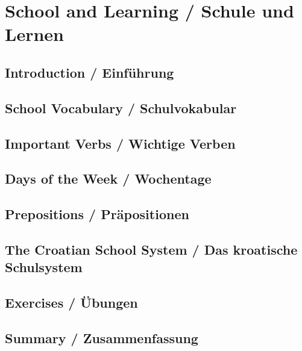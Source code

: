 \chapter{School and Learning / Schule und Lernen}

\section{Introduction / Einführung}

\section{School Vocabulary / Schulvokabular}

\section{Important Verbs / Wichtige Verben}

\section{Days of the Week / Wochentage}

\section{Prepositions / Präpositionen}

\section{The Croatian School System / Das kroatische Schulsystem}

\section{Exercises / Übungen}

\section{Summary / Zusammenfassung}
